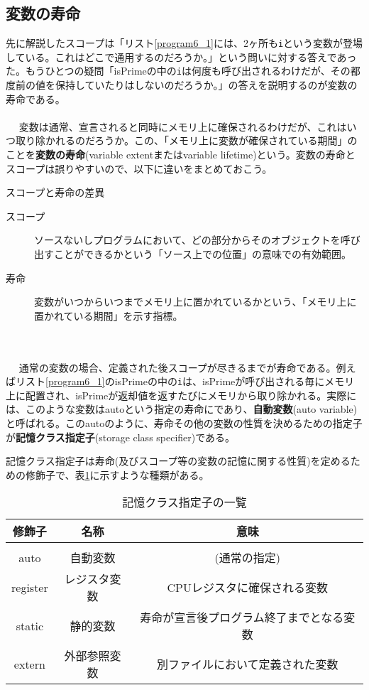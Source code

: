 \subsection{変数の寿命}
先に解説したスコープは「リスト\ref{program6_1}には、2ヶ所も\verb|i|という変数が登場している。これはどこで通用するのだろうか。」という問いに対する答えであった。もうひとつの疑問「isPrimeの中の\verb|i|は何度も呼び出されるわけだが、その都度前の値を保持していたりはしないのだろうか。」の答えを説明するのが変数の寿命である。
\\ \\　
変数は通常、宣言されると同時にメモリ上に確保されるわけだが、これはいつ取り除かれるのだろうか。この、「メモリ上に変数が確保されている期間」のことを\textbf{変数の寿命}(variable extentまたはvariable lifetime)という。変数の寿命とスコープは誤りやすいので、以下に違いをまとめておこう。
\begin{itembox}[l]{スコープと寿命の差異}
\begin{description}
\item[スコープ] ソースないしプログラムにおいて、どの部分からそのオブジェクトを呼び出すことができるかという「ソース上での位置」の意味での有効範囲。
\item[寿命] 変数がいつからいつまでメモリ上に置かれているかという、「メモリ上に置かれている期間」を示す指標。
\end{description}
\end{itembox}
\\ \\　
通常の変数の場合、定義された後スコープが尽きるまでが寿命である。例えばリスト\ref{program6_1}のisPrimeの中の\verb|i|は、isPrimeが呼び出される毎にメモリ上に配置され、isPrimeが返却値を返すたびにメモリから取り除かれる。実際には、このような変数はautoという指定の寿命にであり、\textbf{自動変数}(auto variable)と呼ばれる。このautoのように、寿命その他の変数の性質を決めるための指定子が\textbf{記憶クラス指定子}(storage class specifier)である。

記憶クラス指定子は寿命(及びスコープ等の変数の記憶に関する性質)を定めるための修飾子で、表\ref{tab6_1}に示すような種類がある。
\begin{table}[h]
\centering
\caption{記憶クラス指定子の一覧}\label{tab6_1}
\begin{tabular}{|c|c|c|}\hline
修飾子&名称&意味\\ \hline
&&\\[-15.5pt] \hline
auto&自動変数&(通常の指定)\\ \hline
register&レジスタ変数&CPUレジスタに確保される変数\\ \hline
static&静的変数&寿命が宣言後プログラム終了までとなる変数\\ \hline
extern&外部参照変数&別ファイルにおいて定義された変数\\ \hline
\end{tabular}
\end{table}


